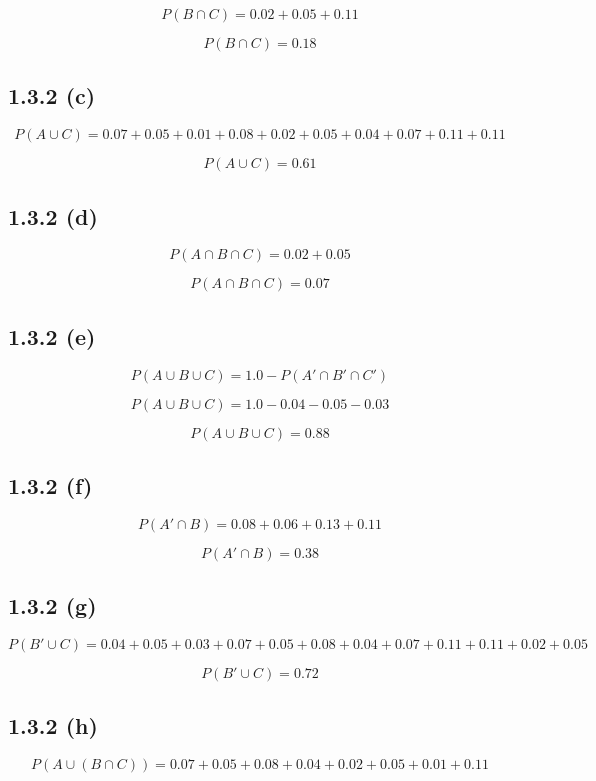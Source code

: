 \documentclass{article}
\begin{document}
\[
P(B\cap C) = 0.02 + 0.05 + 0.11
\]

\[
\boxed{P(B\cap C) = 0.18}
\]

\subsection*{1.3.2 (c)}

\[
P(A\cup C) = 0.07 + 0.05 + 0.01 + 0.08 + 0.02 + 0.05 + 0.04 + 0.07 + 0.11 + 0.11
\]

\[
\boxed{P(A\cup C) = 0.61}
\]

\subsection*{1.3.2 (d)}

\[
P(A\cap B\cap C) = 0.02 + 0.05
\]

\[
\boxed{P(A\cap B\cap C) = 0.07}
\]

\subsection*{1.3.2 (e)}

\[
P(A\cup B\cup C) = 1.0 - P(A'\cap B'\cap C')
\]

\[
P(A\cup B\cup C) = 1.0 - 0.04 - 0.05 - 0.03
\]

\[
P(A\cup B\cup C) = 0.88
\]

\subsection*{1.3.2 (f)}

\[
P(A'\cap B) = 0.08 + 0.06 + 0.13 + 0.11
\]

\[
\boxed{P(A'\cap B) = 0.38}
\]

\subsection*{1.3.2 (g)}

\[
P(B'\cup C) = 0.04 + 0.05 + 0.03 + 0.07 + 0.05 + 0.08 + 0.04 + 0.07 + 0.11 + 0.11 + 0.02 + 0.05
\]

\[
\boxed{P(B'\cup C) = 0.72}
\]

\subsection*{1.3.2 (h)}

\[
P(A\cup (B\cap C)) = 0.07 + 0.05 + 0.08 + 0.04 + 0.02 + 0.05 + 0.01 + 0.11
\]
\end{document}
